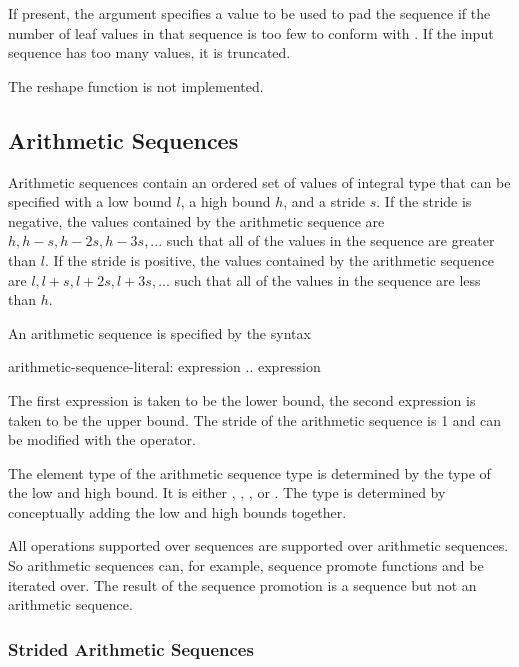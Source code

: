 If present, the  argument specifies a value to be used to
pad the sequence if the number of leaf values in that sequence is too
few to conform with . If the input sequence has too many
values, it is truncated.

\begin{implementation}
The reshape function is not implemented.
\end{implementation}

\subsection{Arithmetic Sequences}
\label{Arithmetic_Sequences}

Arithmetic sequences contain an ordered set of values of integral type
that can be specified with a low bound $l$, a high bound $h$, and a
stride $s$.  If the stride is negative, the values contained by the
arithmetic sequence are $h, h-s, h-2s, h-3s, ...$ such that all of the
values in the sequence are greater than $l$.  If the stride is
positive, the values contained by the arithmetic sequence are $l, l+s,
l+2s, l+3s, ...$ such that all of the values in the sequence are
less than $h$.

An arithmetic sequence is specified by the syntax
\begin{syntax}
arithmetic-sequence-literal:
  expression .. expression
\end{syntax}
The first expression is taken to be the lower bound, the second
expression is taken to be the upper bound.  The stride of the
arithmetic sequence is 1 and can be modified with the 
operator.

The element type of the arithmetic sequence type is determined by the
type of the low and high bound.  It is
either , , , or .  The
type is determined by conceptually adding the low and high bounds
together.

All operations supported over sequences are supported over arithmetic
sequences.  So arithmetic sequences can, for example, sequence promote
functions and be iterated over.  The result of the sequence promotion
is a sequence but not an arithmetic sequence.

\subsubsection{Strided Arithmetic Sequences}
\label{Strided_Arithmetic_Sequences}

